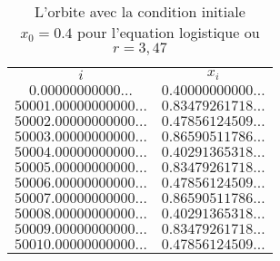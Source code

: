 \begin{table}
\caption{L'orbite avec la condition initiale $x_0=0.4$ pour l'equation logistique ou $r=3,47$}
\label{HS_LOGISTIC4}
\begin{center}
\begin{tabular}{|c|c|}
\cline{1-2}
  $i$   &  $x_i$  \\ 
\cline{1-2}
$0.00000000000\ldots$ & $0.40000000000\ldots$ \\ 
$50001.00000000000\ldots$ & $0.83479261718\ldots$ \\ 
$50002.00000000000\ldots$ & $0.47856124509\ldots$ \\ 
$50003.00000000000\ldots$ & $0.86590511786\ldots$ \\ 
$50004.00000000000\ldots$ & $0.40291365318\ldots$ \\ 
$50005.00000000000\ldots$ & $0.83479261718\ldots$ \\ 
$50006.00000000000\ldots$ & $0.47856124509\ldots$ \\ 
$50007.00000000000\ldots$ & $0.86590511786\ldots$ \\ 
$50008.00000000000\ldots$ & $0.40291365318\ldots$ \\ 
$50009.00000000000\ldots$ & $0.83479261718\ldots$ \\ 
$50010.00000000000\ldots$ & $0.47856124509\ldots$ \\ 
\cline{1-2}
\end{tabular}
\end{center}
\end{table}
